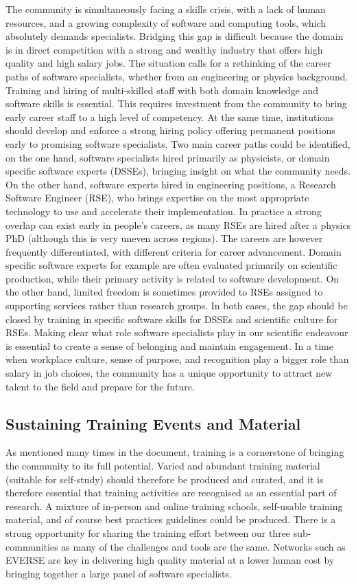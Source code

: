 The community is simultaneously facing a skills crisis, with a lack of human resources, and a growing complexity of software and computing tools, which absolutely demands specialists. Bridging this gap is difficult because the domain is in direct competition with a strong and wealthy industry that offers high quality and high salary jobs. The situation calls for a rethinking of the career paths of software specialists, whether from an engineering or physics background.
Training and hiring of multi-skilled staff with both domain knowledge and software skills is essential. This requires investment from the community to bring early career staff to a high level of competency. At the same time, institutions should develop and enforce a strong hiring policy offering permanent positions early to promising software specialists.
Two main career paths could be identified, on the one hand, software specialists hired primarily as physicists, or domain specific software experts (DSSEs), bringing insight on what the community needs. On the other hand, software experts hired in engineering positions, a Research Software Engineer (RSE), who brings expertise on the most appropriate technology to use and accelerate their implementation.
In practice a strong overlap can exist early in people’s careers, as many RSEs are hired after a physics PhD (although this is very uneven across regions). The careers are however frequently differentiated, with different criteria for career advancement. Domain specific software experts for example are often evaluated primarily on scientific production, while their primary activity is related to software development. On the other hand, limited freedom is sometimes provided to RSEs assigned to supporting services rather than research groups. 
In both cases, the gap should be closed by training in specific software skills for DSSEs and scientific culture for RSEs. Making clear what role software specialists play in our scientific endeavour is essential to create a sense of belonging and maintain engagement. In a time when workplace culture, sense of purpose, and recognition play a bigger role than salary in job choices, the community has a unique opportunity to attract new talent to the field and prepare for the future.

\subsection{Sustaining Training Events and Material}

As mentioned many times in the document, training is a cornerstone of bringing the community to its full potential. Varied and abundant training material (suitable for self-study) should therefore be produced and curated, and it is therefore essential that training activities are recognised as an essential part of research.
A mixture of in-person and online training schools, self-usable training material, and of course best practices guidelines could be produced. There is a strong opportunity for sharing the training effort between our three sub-communities as many of the challenges and tools are the same. Networks such as EVERSE are key in delivering high quality material at a lower human cost by bringing together a large panel of software specialists.



